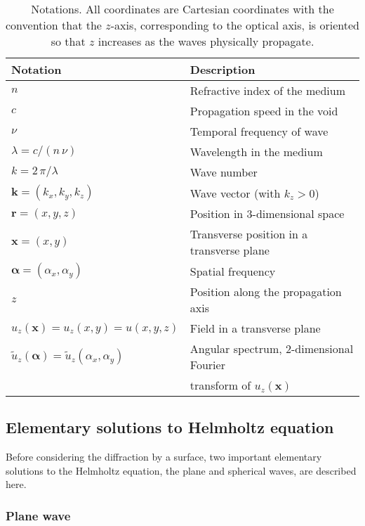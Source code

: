 \documentclass[a4paper]{article}
\newcommand*{\V}[1]{\boldsymbol{#1}}
\newcommand*{\FT}[1]{\widetilde{#1}}
\begin{document}
\begin{table}[t]
  \centering
  \begin{tabular}{ll}
    Notation & Description \\
    \hline
    $n$ & Refractive index of the medium\\
    $c$ & Propagation speed in the void\\
    $ν$ & Temporal frequency of wave\\
    $λ= c/(n\,ν)$ & Wavelength in the medium\\
    $k = 2\,π/λ$ & Wave number\\
    $\V{k} = (k_{x},k_{y},k_{z})$ & Wave vector (with $k_{z} > 0$)\\
    $\V{r} = (x,y,z)$ & Position in 3-dimensional space\\
    $\V{x} = (x,y)$ & Transverse position in a transverse plane\\
    $\V{α} = (α_{x},α_{y})$ & Spatial frequency\\
    $z$ & Position along the propagation axis\\
    $u_{z}(\V{x}) = u_{z}(x,y) = u(x,y,z)$ & Field in a transverse plane\\
    $\FT{u}_{z}(\V{α}) = \FT{u}_{z}(α_{x},α_{y})$
             & Angular spectrum, 2-dimensional Fourier\\
             & transform of $u_{z}(\V{x})$\\
  \end{tabular}
  \caption{Notations. All coordinates are Cartesian coordinates with the convention that
    the $z$-axis, corresponding to the optical axis, is oriented so that $z$ increases as
    the waves physically propagate.}
  \label{tab:notations}
\end{table}


\subsection{Elementary solutions to Helmholtz equation}
\label{sec:elementary-solutions}

Before considering the diffraction by a surface, two important elementary solutions to the
Helmholtz equation, the plane and spherical waves, are described here.

\subsubsection{Plane wave}
\label{sec:plane_wave}
\end{document}
